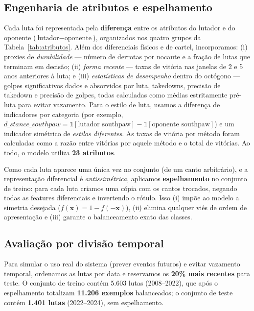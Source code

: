 \documentclass[10pt]{article}
\begin{document}
\subsection{Engenharia de atributos e espelhamento}
Cada luta foi representada pela \textbf{diferença} entre os atributos do lutador
e do oponente ($\text{lutador} - \text{oponente}$), organizados nos quatro
grupos da Tabela~\ref{tab:atributos}. Além dos diferenciais físicos e de cartel,
incorporamos: (i) proxies de \emph{durabilidade} --- número de derrotas por
nocaute e a fração de lutas que terminam em decisão; (ii) \emph{forma recente}
--- taxas de vitória nas janelas de 2 e 5 anos anteriores à luta; e
(iii) \emph{estatísticas de desempenho} dentro do octógono --- golpes
significativos dados e absorvidos por luta, takedowns, precisão de takedown e
precisão de golpes, todas calculadas como médias estritamente pré-luta para
evitar vazamento. Para o estilo de luta, usamos a diferença de indicadores por
categoria (por exemplo,
$d\_stance\_southpaw = \mathbb{1}[\text{lutador southpaw}] -
\mathbb{1}[\text{oponente southpaw}]$) e um indicador simétrico de
\emph{estilos diferentes}. As taxas de vitória por método foram calculadas como
a razão entre vitórias por aquele método e o total de vitórias. Ao todo, o
modelo utiliza \textbf{23 atributos}.

Como cada luta aparece uma única vez no conjunto (de um canto arbitrário), e a
representação diferencial é \emph{antissimétrica}, aplicamos
\textbf{espelhamento} no conjunto de treino: para cada luta criamos uma cópia
com os cantos trocados, negando todas as features diferenciais e invertendo o
rótulo. Isso (i) impõe ao modelo a simetria desejada
($f(\mathbf{x}) = 1 - f(-\mathbf{x})$), (ii) elimina qualquer viés de ordem de
apresentação e (iii) garante o balanceamento exato das classes.

\subsection{Avaliação por divisão temporal}
Para simular o uso real do sistema (prever eventos futuros) e evitar vazamento
temporal, ordenamos as lutas por data e reservamos os \textbf{20\% mais
recentes} para teste. O conjunto de treino contém 5.603 lutas (2008--2022), que
após o espelhamento totalizam \textbf{11.206 exemplos} balanceados; o conjunto
de teste contém \textbf{1.401 lutas} (2022--2024), sem espelhamento.
\end{document}
